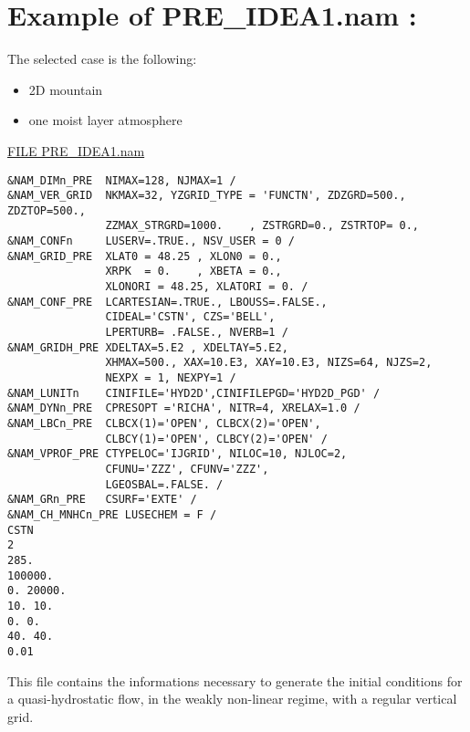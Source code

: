 \section{Example of PRE\_IDEA1.nam : }
The selected case is the following:
\begin{itemize}
\item 2D mountain 
\item  one moist  layer atmosphere
\end{itemize}

\underline{FILE PRE\_IDEA1.nam}

\begin{verbatim}
&NAM_DIMn_PRE  NIMAX=128, NJMAX=1 /
&NAM_VER_GRID  NKMAX=32, YZGRID_TYPE = 'FUNCTN', ZDZGRD=500., ZDZTOP=500., 
               ZZMAX_STRGRD=1000.    , ZSTRGRD=0., ZSTRTOP= 0., 
&NAM_CONFn     LUSERV=.TRUE., NSV_USER = 0 /
&NAM_GRID_PRE  XLAT0 = 48.25 , XLON0 = 0.,
               XRPK  = 0.    , XBETA = 0.,
               XLONORI = 48.25, XLATORI = 0. /
&NAM_CONF_PRE  LCARTESIAN=.TRUE., LBOUSS=.FALSE., 
               CIDEAL='CSTN', CZS='BELL', 
               LPERTURB= .FALSE., NVERB=1 /
&NAM_GRIDH_PRE XDELTAX=5.E2 , XDELTAY=5.E2, 
               XHMAX=500., XAX=10.E3, XAY=10.E3, NIZS=64, NJZS=2, 
               NEXPX = 1, NEXPY=1 /
&NAM_LUNITn    CINIFILE='HYD2D',CINIFILEPGD='HYD2D_PGD' /
&NAM_DYNn_PRE  CPRESOPT ='RICHA', NITR=4, XRELAX=1.0 /
&NAM_LBCn_PRE  CLBCX(1)='OPEN', CLBCX(2)='OPEN', 
               CLBCY(1)='OPEN', CLBCY(2)='OPEN' /
&NAM_VPROF_PRE CTYPELOC='IJGRID', NILOC=10, NJLOC=2,  
               CFUNU='ZZZ', CFUNV='ZZZ',
               LGEOSBAL=.FALSE. /
&NAM_GRn_PRE   CSURF='EXTE' /
&NAM_CH_MNHCn_PRE LUSECHEM = F /
CSTN
2
285.
100000.
0. 20000.
10. 10.
0. 0.
40. 40.
0.01
\end{verbatim}

  
This file contains the  informations necessary to generate the initial 
conditions for a quasi-hydrostatic flow, in the weakly
non-linear regime, with a regular vertical grid.

